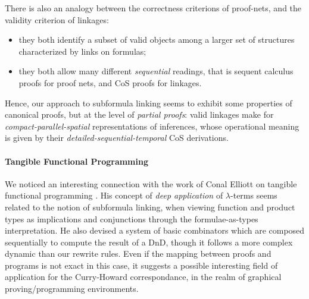 There is also an analogy between the correctness criterions of proof-nets, and
the validity criterion of linkages:
\begin{itemize}
  \item they both identify a subset of valid objects among a larger set of
  structures characterized by links on formulas;
  \item they both allow many different \emph{sequential} readings, that is
  sequent calculus proofs for proof nets, and CoS proofs for
  linkages.
\end{itemize}
Hence, our approach to subformula linking seems to exhibit some properties of
canonical proofs, but at the level of \emph{partial proofs}: valid linkages make
for \emph{compact-parallel-spatial} representations of inferences, whose
operational meaning is given by their \emph{detailed-sequential-temporal} CoS
derivations.



\paragraph{Tangible Functional Programming}

We noticed an interesting connection with the work of Conal Elliott on
tangible functional programming . His concept
of \emph{deep application} of $\lambda$-terms seems related to the
notion of subformula linking, when viewing function and product types
as implications and conjunctions through the formulae-as-types
interpretation. He also devised a system of basic combinators which
are composed sequentially to compute the result of a DnD, though it
follows a more complex dynamic than our rewrite rules. Even if the
mapping between proofs and programs is not exact in this case, it
suggests a possible interesting field of application for the
Curry-Howard correspondance, in the realm of graphical
proving/programming environments.